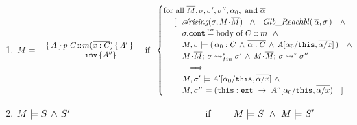 \begin{definition}
\begin{enumerate}
  \item
$  
 \satisfies{M}
{
  \begin{array}{l}
  { \mprepostNTwo{A}{p\ C}{m}{x}{C}{A'} {A''} }
  \end{array} 
}
 \ \,  \mbox{if}  \   \ 
    \begin{cases}
     \mbox{for all }   \Mtwo,  \sigma, \sigma',\sigma'', \alpha_0, \mbox{ and }  \overline{\alpha}    \\
   \ \ \ \  [ \ \ { \arising{\sigma}{M\madd \Mtwo }\   \  \wedge\ \ \GRelevant {\overline \alpha}  \sigma}\ \ \ \wedge  \\
  \ \ \ \  \ \ \   \sigma.\prg{cont}\txteq \mbox{body of $C::m$} \ \ \wedge  \\
  \ \ \ \  \ \ \  \satisfiesA {M}   {\sigma}  {(\, \alpha_0:C \, \wedge\, \overline {\alpha:C} \, \wedge\,  {A[\alpha_0/\prg{this},\overline{\alpha/x}]}\, ) } \ \ \ \wedge   \\
   \ \ \   \ \ \  \ {\leadstoBoundedStarFin {M\madd \Mtwo}{\sigma}  {\sigma'} }  \, \wedge  \, {\leadstoBoundedStar  {M\madd \Mtwo}{\sigma}  {\sigma''} } \\
 \ \ \ \   \ \ \ \ \  \ \Longrightarrow   \\
 \ \ \ \   \ \ \  {\satisfiesA{M}{\sigma'}{ A'[\alpha_0/\prg{this},\overline{\alpha/x}]}  }\ \wedge\\
 \ \ \ \   \ \ \      {\satisfiesA{M}{\sigma''}{ ( \external{\prg{this}}\ \rightarrow\ A''[\alpha_0/\prg{this},\overline{\alpha/x}})}\ \  \ ]
    \end{cases} 
    $
 \item
 $M \models S\, \wedge\, S'$\ \ \ \ \ \  \ \ \ \ \ \ \ \ \ \ \ \ \ \ \ \ \ \ \  \ \ \  if  \  \ \  \   $\satisfies{M}{S}\ \wedge \ \satisfies{M}{S'}$
\end{enumerate}
\end{definition}

